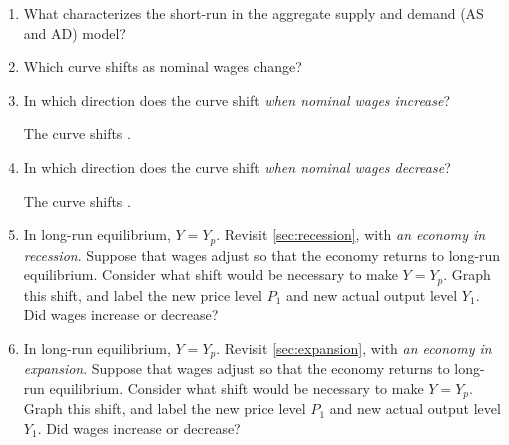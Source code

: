 \documentclass[
    letterpaper,paper=portrait,fleqn,
    DIV=16,fontsize=12pt,twoside=semi,
    parskip=full-,
    headings=standardclasses]
{scrartcl}
\begin{document}
\begin{enumerate}[font={\bfseries}]

\item What characterizes the short-run in the aggregate supply and demand (AS and AD) model?

\vfill

\item Which curve shifts as nominal wages change?

\vfill

\item In which direction does the curve shift \emph{when nominal wages increase}?

\vspace{1.0\baselineskip}
The \underline{\hspace{2in}} curve shifts \underline{\hspace{2in}}.
\vspace{1.0\baselineskip}

\item In which direction does the curve shift \emph{when nominal wages decrease}?

\vspace{1.0\baselineskip}
The \underline{\hspace{2in}} curve shifts \underline{\hspace{2in}}.
\vspace{1.0\baselineskip}

\item In long-run equilibrium, $Y=Y_p$. Revisit \cref{sec:recession}, with \emph{an economy in recession}. Suppose that wages adjust so that the economy returns to long-run equilibrium. Consider what shift would be necessary to make $Y=Y_p$. Graph this shift, and label the new price level $P_1$ and new actual output level $Y_1$. Did wages increase or decrease?

\vfill

\item In long-run equilibrium, $Y=Y_p$. Revisit \cref{sec:expansion}, with \emph{an economy in expansion}. Suppose that wages adjust so that the economy returns to long-run equilibrium. Consider what shift would be necessary to make $Y=Y_p$. Graph this shift, and label the new price level $P_1$ and new actual output level $Y_1$. Did wages increase or decrease?

\vfill

\vspace{-2\baselineskip}
\clearpage

\end{enumerate}
\end{document}
